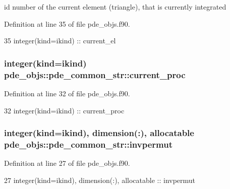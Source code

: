 id number of the current element (triangle), that is currently integrated 



Definition at line 35 of file pde\+\_\+objs.\+f90.


\begin{DoxyCode}
35     \textcolor{keywordtype}{integer(kind=ikind)} :: current\_el
\end{DoxyCode}
\subsubsection[{current\+\_\+proc}]{\setlength{\rightskip}{0pt plus 5cm}integer(kind=ikind) pde\+\_\+objs\+::pde\+\_\+common\+\_\+str\+::current\+\_\+proc}\label{structpde__objs_1_1pde__common__str_aba4935275976f5f085576120a51673e4}


Definition at line 32 of file pde\+\_\+objs.\+f90.


\begin{DoxyCode}
32     \textcolor{keywordtype}{integer(kind=ikind)}                              :: current\_proc
\end{DoxyCode}
\subsubsection[{invpermut}]{\setlength{\rightskip}{0pt plus 5cm}integer(kind=ikind), dimension(\+:), allocatable pde\+\_\+objs\+::pde\+\_\+common\+\_\+str\+::invpermut}\label{structpde__objs_1_1pde__common__str_abceb8eeeda6abb65e7bae047ac726329}


Definition at line 27 of file pde\+\_\+objs.\+f90.


\begin{DoxyCode}
27     \textcolor{keywordtype}{integer(kind=ikind)}, \textcolor{keywordtype}{dimension(:)}, \textcolor{keywordtype}{allocatable} :: invpermut
\end{DoxyCode}
